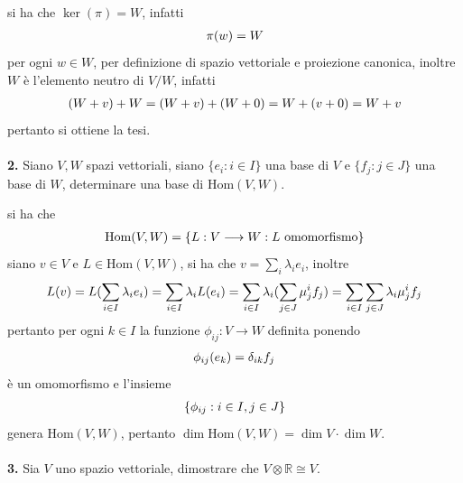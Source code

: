 \documentclass[oneside, 11pt]{amsbook}
\makeatletter
\newcommand{\0}{{(0)}}
\newcommand{\3}{{(3)}}
\theoremstyle{colonplain}
\theoremstyle{colondefinition}
\theoremstyle{colonremark}
\numberwithin{equation}{chapter}
\renewcommand{\proofname}{Dimostrazione}
\renewenvironment{proof}[1][\proofname]{\par
  \pushQED{\qed}%
  \normalfont \topsep6\p@\@plus6\p@\relax
  \trivlist
  \item[\hskip\labelsep\bfseries #1:]\ignorespaces
}{%
  \popQED\endtrivlist\@endpefalse
}
\makeatother
\begin{document}
\begin{proof} si ha che $\ker (\pi) = W$, infatti
\begin{align}
    \pi(w) = W \notag
\end{align}
per ogni $w \in W$, per definizione di spazio vettoriale e proiezione canonica, inoltre $W$ è l'elemento neutro di $V/W$, infatti
\begin{align}
    (W + v) + W = (W + v) + (W + 0) = W + (v + 0) = W + v \notag
\end{align}
pertanto si ottiene la tesi. \\ \\
\end{proof}
\textbf{2.} Siano $V, W$ spazi vettoriali, siano $\{ e_i : i \in I \}$ una base di $V$ e $\{ f_j : j \in J \}$ una base di $W$, determinare una base di $\mathrm{Hom} (V, W)$. \\

\begin{proof} si ha che
\begin{align}
    \mathrm{Hom}(V, W) = \{ L : V \longrightarrow W : L \text{ omomorfismo} \} \notag
\end{align}
siano $v \in V$ e $L \in \mathrm{Hom}(V, W)$, si ha che $v = \sum_i \lambda_i e_i$, inoltre
\begin{align}
    L(v) = L( \sum_{i \in I} \lambda_i e_i) = \sum_{i \in I} \lambda_i L(e_i) = \sum_{i \in I} \lambda_i ( \sum_{j \in J} \mu^i_j f_j) = \sum_{i \in I} \sum_{j \in J} \lambda_i \mu^i_j f_j  \notag
\end{align}
pertanto per ogni $k \in I$ la funzione $\phi_{ij} : V \longrightarrow W$ definita ponendo
\begin{align}
    \phi_{ij}(e_k) = \delta_{ik}f_j \notag
\end{align}
è un omomorfismo e l'insieme
\begin{align}
    \{ \phi_{ij} : i \in I, j \in J \} \notag
\end{align}
genera $\mathrm{Hom}(V, W)$, pertanto $\dim \mathrm{Hom}(V, W) = \dim V \cdot \dim W$. \\ \\
\end{proof}
\textbf{3.} Sia $V$ uno spazio vettoriale, dimostrare che $V \otimes \mathbb{R} \cong V$. \\
\end{document}
